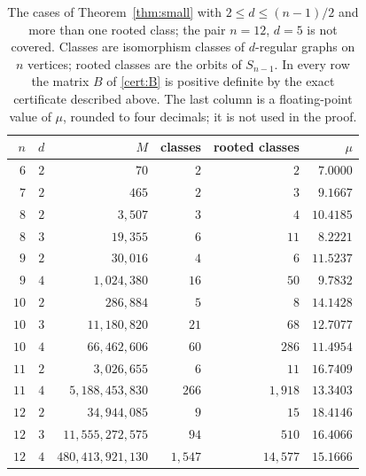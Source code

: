 \begin{table}[ht]
\centering
\begin{tabular}{rrrrrr}
\toprule
$n$ & $d$ & $M$ & classes & rooted classes & $\mu$\\
\midrule
$6$ & $2$ & $70$ & $2$ & $2$ & $7.0000$\\
$7$ & $2$ & $465$ & $2$ & $3$ & $9.1667$\\
$8$ & $2$ & $3{,}507$ & $3$ & $4$ & $10.4185$\\
$8$ & $3$ & $19{,}355$ & $6$ & $11$ & $8.2221$\\
$9$ & $2$ & $30{,}016$ & $4$ & $6$ & $11.5237$\\
$9$ & $4$ & $1{,}024{,}380$ & $16$ & $50$ & $9.7832$\\
$10$ & $2$ & $286{,}884$ & $5$ & $8$ & $14.1428$\\
$10$ & $3$ & $11{,}180{,}820$ & $21$ & $68$ & $12.7077$\\
$10$ & $4$ & $66{,}462{,}606$ & $60$ & $286$ & $11.4954$\\
$11$ & $2$ & $3{,}026{,}655$ & $6$ & $11$ & $16.7409$\\
$11$ & $4$ & $5{,}188{,}453{,}830$ & $266$ & $1{,}918$ & $13.3403$\\
$12$ & $2$ & $34{,}944{,}085$ & $9$ & $15$ & $18.4146$\\
$12$ & $3$ & $11{,}555{,}272{,}575$ & $94$ & $510$ & $16.4066$\\
$12$ & $4$ & $480{,}413{,}921{,}130$ & $1{,}547$ & $14{,}577$ & $15.1666$\\
\bottomrule
\end{tabular}
\caption{The cases of Theorem~\ref{thm:small} with $2\le d\le(n-1)/2$ and
more than one rooted class; the pair $n=12$, $d=5$ is not covered. Classes are isomorphism classes of $d$-regular
graphs on $n$ vertices; rooted classes are the orbits of $S_{n-1}$. In every
row the matrix $B$ of \eqref{cert:B} is positive definite by the exact
certificate described above. The last column is a floating-point value of $\mu$, rounded to
four decimals; it is not used in the proof.}\label{cert:table}
\end{table}
